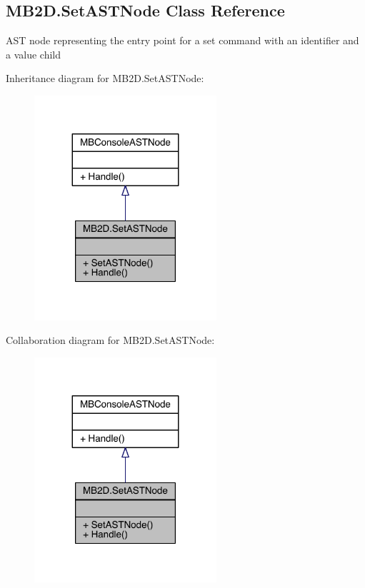 \hypertarget{class_m_b2_d_1_1_set_a_s_t_node}{}\subsection{M\+B2\+D.\+Set\+A\+S\+T\+Node Class Reference}
\label{class_m_b2_d_1_1_set_a_s_t_node}


A\+ST node representing the entry point for a \textquotesingle{}set\textquotesingle{} command with an identifier and a value child  




Inheritance diagram for M\+B2\+D.\+Set\+A\+S\+T\+Node\+:
\nopagebreak
\begin{figure}[H]
\begin{center}
\leavevmode
\includegraphics[width=191pt]{class_m_b2_d_1_1_set_a_s_t_node__inherit__graph}
\end{center}
\end{figure}


Collaboration diagram for M\+B2\+D.\+Set\+A\+S\+T\+Node\+:
\nopagebreak
\begin{figure}[H]
\begin{center}
\leavevmode
\includegraphics[width=191pt]{class_m_b2_d_1_1_set_a_s_t_node__coll__graph}
\end{center}
\end{figure}
